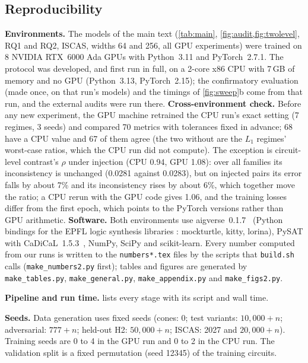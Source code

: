 \subsection{Reproducibility}\label{app:repro}
\noindent\textbf{Environments.} The models of the main text (\cref{tab:main}, \cref{fig:audit,fig:twolevel}, RQ1 and RQ2,
ISCAS, widths 64 and 256, all GPU experiments) were trained on 8 NVIDIA RTX~6000 Ada GPUs with Python~3.11 and
PyTorch~2.7.1. The protocol was developed, and first run in full, on a 2-core x86 CPU with 7\,GB of memory and no GPU
(Python~3.13, PyTorch~2.15); the confirmatory evaluation (made once, on that run's models) and the timings of
\cref{fig:sweep}b come from that run, and the external audits were run there. \textbf{Cross-environment check.} Before any new experiment, the GPU machine retrained the CPU run's exact
setting (7 regimes, 3 seeds) and compared 70 metrics with tolerances fixed in advance; 68 have a CPU value and 67 of them agree (the two without are the
$L_1$ regimes' worst-case ratios, which the CPU run did not compute). The exception is
circuit-level contrast's $\rho$ under injection (CPU 0.94, GPU 1.08): over all families its inconsistency is unchanged
(0.0281 against 0.0283), but on injected pairs its error falls by about 7\% and its inconsistency rises by about 6\%,
which together move the ratio; a CPU rerun with the GPU code gives 1.06, and the training losses differ
from the first epoch, which points to the PyTorch versions rather than GPU arithmetic. \textbf{Software.} Both environments use aigverse~0.1.7~\cite{aigverse} (Python bindings for the EPFL logic synthesis libraries
\cite{DBLP:journals/corr/abs-1805-05121}: mockturtle, kitty, lorina),
PySAT with CaDiCaL~1.5.3~\cite{DBLP:conf/sat/IgnatievMM18,cadical2020}, NumPy, SciPy and scikit-learn. Every number computed from our runs is
written to the \texttt{numbers*.tex} files by the scripts that \texttt{build.sh} calls (\texttt{make\_numbers2.py} first); tables and figures are generated by
\texttt{make\_tables.py}, \texttt{make\_general.py}, \texttt{make\_appendix.py} and \texttt{make\_figs2.py}.


\noindent\textbf{Pipeline and run time.}  lists every stage with its script and wall time.

\noindent\textbf{Seeds.} Data generation uses fixed seeds (cones: 0; test variants: $10{,}000+n$; adversarial:
$777+n$; held-out H2: $50{,}000+n$; ISCAS: 2027 and $20{,}000+n$). Training seeds are 0 to 4 in the GPU run and 0 to 2 in the CPU run. The validation
split is a fixed permutation (seed 12345) of the training circuits.

